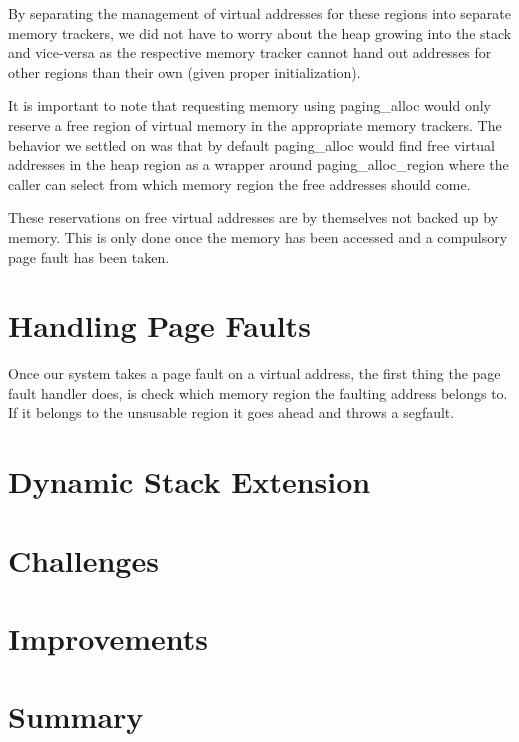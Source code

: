 By separating the management of virtual addresses for these regions into separate memory trackers,
we did not have to worry about the heap growing into the stack and vice-versa as the respective 
memory tracker cannot hand out addresses for other regions than their own (given proper initialization).

It is important to note that requesting memory using paging_alloc would only reserve a free region
of virtual memory in the appropriate memory trackers. The behavior we settled on was that by default
paging_alloc would find free virtual addresses in the heap region as a wrapper around
paging_alloc_region where the caller can select from which memory region the free addresses should come.

These reservations on free virtual addresses are by themselves not backed up by memory. This is only
done once the memory has been accessed and a compulsory page fault has been taken.

\section{Handling Page Faults}
Once our system takes a page fault on a virtual address, the first thing the page fault handler does,
is check which memory region the faulting address belongs to. If it belongs to the unsusable region
it goes ahead and throws a segfault.

\section{Dynamic Stack Extension}

\section{Challenges}

\section{Improvements}

\section{Summary}
